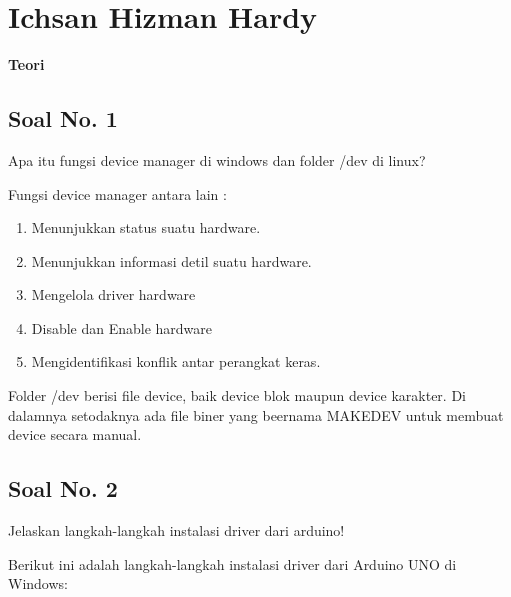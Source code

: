 \section{Ichsan Hizman Hardy}
{\Large \textbf{Teori}}
\subsection{Soal No. 1}
Apa itu fungsi device manager di windows dan folder /dev di linux?

\hfill \break
Fungsi device manager antara lain :
\begin{enumerate}
	\item Menunjukkan status suatu hardware.
	\item Menunjukkan informasi detil suatu hardware.
	\item Mengelola driver hardware
	\item Disable dan Enable hardware
	\item Mengidentifikasi konflik antar perangkat keras.
\end{enumerate}

\hfill \break
Folder /dev berisi file device, baik device blok maupun device karakter. Di dalamnya setodaknya ada file biner yang beernama MAKEDEV untuk membuat device secara manual.

\subsection{Soal No. 2}
Jelaskan langkah-langkah instalasi driver dari arduino!

\hfill \break
Berikut ini adalah langkah-langkah instalasi driver dari Arduino UNO di Windows:

